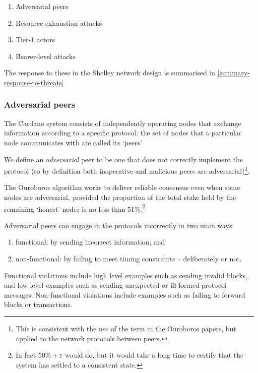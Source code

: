 \documentclass[11pt,a4paper]{article}
\begin{document}
\begin{enumerate}
\item
  Adversarial peers
\item
  Resource exhaustion attacks
\item
  Tier-1 actors
\item
  Bearer-level attacks
\end{enumerate}

The response to these in the Shelley network design is summarised in
\cref{summary-response-to-threats}

\subsubsection{Adversarial peers}
\label{adversarial-peers}

The Cardano system consists of independently operating nodes that
exchange information according to a specific protocol; the set of nodes
that a particular node communicates with are called its `peers'.

We define an \emph{adversarial} peer to be one that does not correctly
implement the protocol (so by definition both inoperative and malicious
peers are adversarial)\footnote{This is consistent with the use of the
  term in the Ouroboros papers, but applied to the network protocols
  between peers.}.

The Ouroboros algorithm works to deliver reliable consensus even when
some nodes are adversarial, provided the proportion of the total stake
held by the remaining `honest' nodes is no less than 51\%.\footnote{In
  fact $50\%+\varepsilon$ would do, but it would take a long time to certify that
  the system has settled to a consistent state.}

Adversarial peers can engage in the protocols incorrectly in two main
ways:

\begin{enumerate}
\item
  functional: by sending incorrect information; and
\item
  non-functional: by failing to meet timing constraints -- deliberately
  or not.
\end{enumerate}

Functional violations include high level examples such as sending
invalid blocks, and low level examples such as sending unexpected or
ill-formed protocol messages. Non-functional violations include examples
such as failing to forward blocks or transactions.
\end{document}
